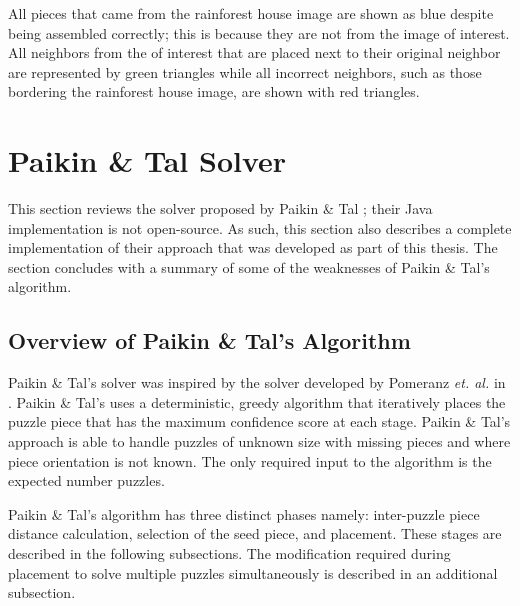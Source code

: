 \documentclass{report}
\begin{document}
All pieces that came from the rainforest house image are shown as blue despite being assembled correctly; this is because they are not from the image of interest.  All neighbors from the of interest that are placed next to their original neighbor are represented by green triangles while all incorrect neighbors, such as those bordering the rainforest house image, are shown with red triangles.









\pagebreak
\section{Paikin \& Tal Solver}\label{sec:paikinTalSolver}

This section reviews the solver proposed by Paikin \& Tal \cite{paikin2015}; their Java implementation is not open-source.  As such, this section also describes a complete implementation of their approach that was developed as part of this thesis.  The section concludes with a summary of some of the weaknesses of Paikin \& Tal's algorithm. 

\subsection{Overview of Paikin \& Tal's Algorithm}\label{sec:paikinTalAlgorithm}

Paikin \& Tal's solver was inspired by the solver developed by Pomeranz \textit{et. al.} in \cite{pomeranz2011}.  Paikin \& Tal's uses a deterministic, greedy algorithm that iteratively places the puzzle piece that has the maximum confidence score at each stage. Paikin \& Tal's approach is able to handle puzzles of unknown size with missing pieces and where piece orientation is not known.  The only required input to the algorithm is the expected number puzzles.

Paikin \& Tal's algorithm has three distinct phases namely: inter-puzzle piece distance calculation, selection of the seed piece, and placement.  These stages are described in the following subsections.  The modification required during placement to solve multiple puzzles simultaneously is described in an additional subsection.
\end{document}
